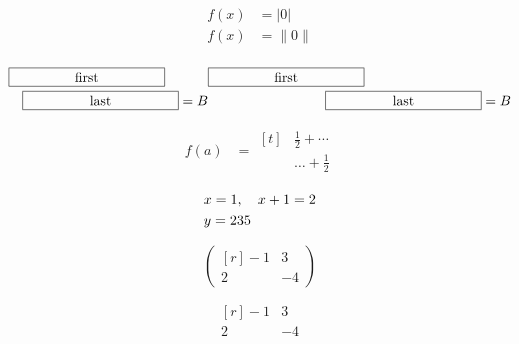 \documentclass{article}
\begin{document}
\begin{align}
  f(x) &= \bigg\lvert 0 \bigg\rvert \\
  f(x) &= \Bigg\lVert 0 \Bigg\rVert \\
\end{align}

\[
  \begin{multlined}[b]
    \framebox[4cm]{first} \\
    \framebox[4cm]{last}
  \end{multlined} = B
  \begin{multlined}[b][7cm]
    \framebox[4cm]{first} \\
    \framebox[4cm]{last}
  \end{multlined} = B
\]

\begin{align*}
  f(a) &=
  \!\begin{aligned}[t]
    & \frac{1}{2}+\cdots \\& \dots+\frac{1}{2}
  \end{aligned}
\end{align*}

\begin{equation}
  \begin{lgathered}[c]
    x=1,\quad x+1=2 \\
    y=235
  \end{lgathered}
\end{equation}

\[
  \begin{pmatrix*}[r]
    -1 & 3 \\
    2  & -4
  \end{pmatrix*}
\]

\[
  \begin{smallmatrix*}[r]
    -1 & 3 \\
    2  & -4
  \end{smallmatrix*}
\]
\end{document}
